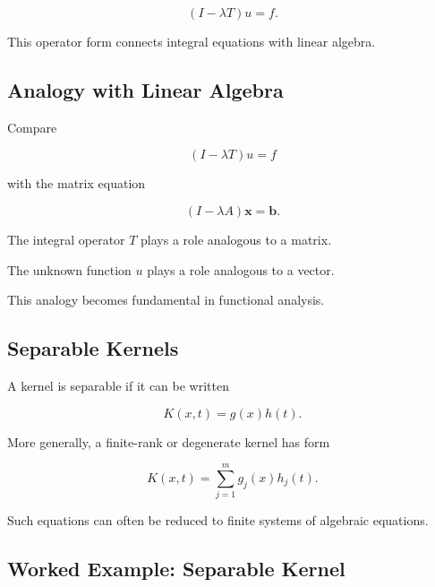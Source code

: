 \[
\boxed{
(I-\lambda T)u
=
f.
}
\]

This operator form connects integral equations with linear algebra.

\subsection{Analogy with Linear Algebra}
\label{subsec:integral-equation-linear-algebra-analogy}

Compare

\[
\boxed{
(I-\lambda T)u=f
}
\]

with the matrix equation

\[
\boxed{
(I-\lambda A)\mathbf{x}
=
\mathbf{b}.
}
\]

The integral operator \(T\) plays a role analogous to a matrix.

The unknown function \(u\) plays a role analogous to a vector.

This analogy becomes fundamental in functional analysis.

\subsection{Separable Kernels}
\label{subsec:separable-kernels}

A kernel is separable if it can be written

\[
\boxed{
K(x,t)
=
g(x)h(t).
}
\]

More generally, a finite-rank or degenerate kernel has form

\[
\boxed{
K(x,t)
=
\sum_{j=1}^{m}
g_j(x)h_j(t).
}
\]

Such equations can often be reduced to finite systems of algebraic
equations.

\subsection{Worked Example: Separable Kernel}
\label{subsec:worked-separable-kernel}

